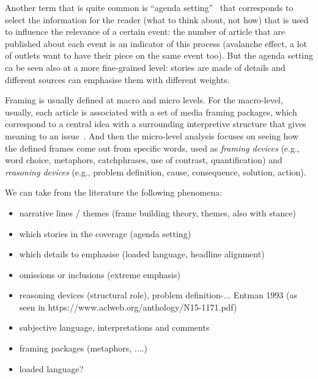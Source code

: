 Another term that is quite common is ``agenda setting''~\cite{mccombs1972agenda} that corresponds to select the information for the reader (what to think about, not how) that is used to influence the relevance of a certain event: the number of article that are published about each event is an indicator of this process (avalanche effect, a lot of outlets want to have their piece on the same event too).
But the agenda setting ca be seen also at a more fine-grained level: stories are made of details and different sources can emphasise them with different weights.


Framing is usually defined at macro and micro levels.
For the macro-level, usually, each article is associated with a set of media framing packages, which correspond to a central idea with a surrounding interpretive structure that gives meaning to an issue~\cite{gamson1989media}. And then the micro-level analysis focuses on seeing how the defined frames come out from specific words, used as \textit{framing devices} (e.g., word choice, metaphors, catchphrases, use of contrast, quantification) and \textit{reasoning devices} (e.g., problem definition, cause, consequence, solution, action).

We can take from the literature the following phenomena:

\begin{itemize}
    \item narrative lines / themes (frame building theory, themes, also with stance)
    \item which stories in the coverage (agenda setting)
    \item which details to emphasise (loaded language, headline alignment)
    \item omissions or inclusions (extreme emphasis)
    \item reasoning devices (structural role), problem definition-...  Entman 1993 (as seen in https://www.aclweb.org/anthology/N15-1171.pdf)
    \item subjective language, interpretations and comments
    \item framing packages (metaphors, ....)
    \item loaded language?
\end{itemize}


